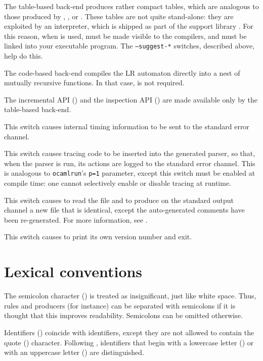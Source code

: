 \documentclass[onecolumn,11pt,nocopyrightspace,preprint]{sigplanconf}
\begin{document}
The table-based back-end produces rather compact tables, which are analogous
to those produced by \yacc, \bison, or \ocamlyacc. These tables are not quite
stand-alone: they are exploited by an interpreter, which is shipped as part of
the support library \menhirlib. For this reason, when \otable is used,
\menhirlib must be made visible to the \ocaml compilers, and must be linked
into your executable program. The \texttt{--suggest-*} switches, described
above, help do this.

The code-based back-end compiles the LR automaton directly into a nest of
mutually recursive \ocaml functions. In that case, \menhirlib is not required.

The incremental API () and the inspection API
() are made available only by the table-based back-end.

\docswitch{\otimings} This switch causes internal timing information to
be sent to the standard error channel.

\docswitch{\otrace} This switch causes tracing code to be inserted into
the generated parser, so that, when the parser is run, its actions are
logged to the standard error channel. This is analogous to \texttt{ocamlrun}'s
\texttt{p=1} parameter, except this switch must be enabled at compile time:
one cannot selectively enable or disable tracing at runtime.

 This switch causes \menhir to
read the \messages file  and to produce on the standard output
channel a new \messages file that is identical, except the auto-generated
comments have been re-generated. For more information,
see .

\docswitch{\oversion} This switch causes \menhir to print its own version
number and exit.


\section{Lexical conventions}

The semicolon character (\kw{;}) is treated as insignificant, just like white
space. Thus, rules and producers (for instance) can be separated with
semicolons if it is thought that this improves readability. Semicolons can be
omitted otherwise.

Identifiers () coincide with \ocaml identifiers, except they are not
allowed to contain the quote () character. Following
\ocaml, identifiers that begin with a lowercase letter
() or with an uppercase letter () are distinguished.
\end{document}
